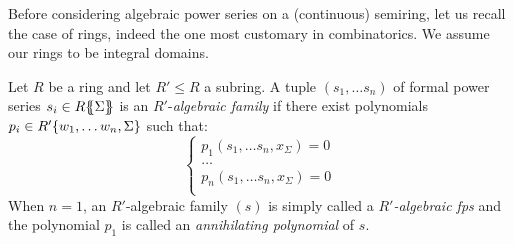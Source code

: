 %  
  
   
   
   
%
%
%  
  
  Before considering algebraic power series on a (continuous) semiring, let us recall the case of rings, indeed the one most customary in combinatorics. We assume our rings to be integral domains.
  \begin{definition}\label{def:fas1}
  	Let $R$ be a ring  and let $R'\leq R$ a subring.
  	A tuple $(s_1, \dots s_n)$ of formal power series $s_i \in {R}\{\!\!\{\Sigma\}\!\!\}$ is an $R'$-\emph{algebraic family} if there exist polynomials $p_i \in {R'}\{w_1, \dots w_n, \Sigma\}$ such that:
  	\begin{equation*}
  	\begin{cases}
  		p_1(s_1, \dots s_n, x_\Sigma)=0\\
  		\dots\\
  		p_n(s_1, \dots s_n, x_\Sigma)=0\\
  	\end{cases}
  	\end{equation*}
  	 When $n=1$, an $R'$-algebraic family $(s)$ is simply called a 
	 \emph{$R'$-algebraic fps} and the polynomial $p_1$ is called an \emph{annihilating polynomial} of $s$.
%	 
  \end{definition}
  


